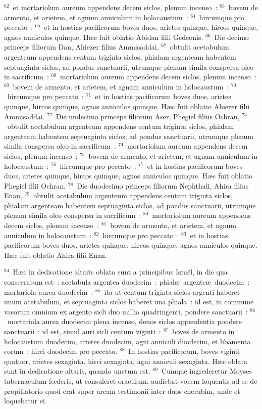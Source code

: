 ${}^{62}$~et mortariolum aureum appendens decem siclos, plenum incenso~:
${}^{63}$~bovem de armento, et arietem, et agnum anniculum in holocaustum~:
${}^{64}$~hircumque pro peccato~:
${}^{65}$~et in hostias pacificorum boves duos, arietes quinque, hircos quinque, agnos anniculos quinque. H\ae c fuit oblatio Abidan filii Gedeonis.
${}^{66}$~Die decimo princeps filiorum Dan, Ahiezer filius Ammisaddai,
${}^{67}$~obtulit acetabulum argenteum appendens centum triginta siclos, phialam argenteam habentem septuaginta siclos, ad pondus sanctuarii, utrumque plenum simila conspersa oleo in sacrificum~:
${}^{68}$~mortariolum aureum appendens decem siclos, plenum incenso~:
${}^{69}$~bovem de armento, et arietem, et agnum anniculum in holocaustum~:
${}^{70}$~hircumque pro peccato~:
${}^{71}$~et in hostias pacificorum boves duos, arietes quinque, hircos quinque, agnos anniculos quinque. H\ae c fuit oblatio Ahiezer filii Ammisaddai.
${}^{72}$~Die undecimo princeps filiorum Aser, Phegiel filius Ochran,
${}^{73}$~obtulit acetabulum argenteum appendens centum triginta siclos, phialam argenteam habentem septuaginta siclos, ad pondus sanctuarii, utrumque plenum simila conspersa oleo in sacrificum~:
${}^{74}$~mortariolum aureum appendens decem siclos, plenum incenso~:
${}^{75}$~bovem de armento, et arietem, et agnum anniculum in holocaustum~:
${}^{76}$~hircumque pro peccato~:
${}^{77}$~et in hostias pacificorum boves duos, arietes quinque, hircos quinque, agnos anniculos quinque. H\ae c fuit oblatio Phegiel filii Ochran.
${}^{78}$~Die duodecimo princeps filiorum Nephthali, Ahira filius Enan,
${}^{79}$~obtulit acetabulum argenteum appendens centum triginta siclos, phialam argenteam habentem septuaginta siclos, ad pondus sanctuarii, utrumque plenum simila oleo conspersa in sacrificum~:
${}^{80}$~mortariolum aureum appendens decem siclos, plenum incenso~:
${}^{81}$~bovem de armento, et arietem, et agnum anniculum in holocaustum~:
${}^{82}$~hircumque pro peccato~:
${}^{83}$~et in hostias pacificorum boves duos, arietes quinque, hircos quinque, agnos anniculos quinque. H\ae c fuit oblatio Ahira filii Enan.


${}^{84}$~H\ae c in dedicatione altaris oblata sunt a principibus Isra\"el, in die qua consecratum est~: acetabula argentea duodecim~: phial\ae\ argente\ae\ duodecim~: mortariola aurea duodecim~:
${}^{85}$~ita ut centum triginta siclos argenti haberet unum acetabulum, et septuaginta siclos haberet una phiala~: id est, in commune vasorum omnium ex argento sicli duo millia quadringenti, pondere sanctuarii~:
${}^{86}$~mortariola aurea duodecim plena incenso, denos siclos appendentia pondere sanctuarii~: id est, simul auri sicli centum viginti~:
${}^{87}$~boves de armento in holocaustum duodecim, arietes duodecim, agni anniculi duodecim, et libamenta eorum~: hirci duodecim pro peccato.
${}^{88}$~In hostias pacificorum, boves viginti quatuor, arietes sexaginta, hirci sexaginta, agni anniculi sexaginta. H\ae c oblata sunt in dedicatione altaris, quando unctum est.
${}^{89}$~Cumque ingrederetur Moyses tabernaculum fœderis, ut consuleret oraculum, audiebat vocem loquentis ad se de propitiatorio quod erat super arcam testimonii inter duos cherubim, unde et loquebatur ei.


